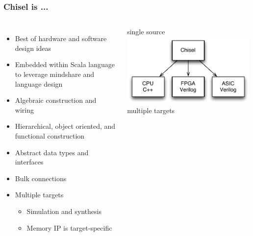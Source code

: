 \documentclass[xcolor=pdflatex,dvipsnames,table]{beamer}
\begin{document}
\begin{frame}[fragile]
\frametitle{Chisel is ...}

\begin{columns}[c]


\begin{itemize}
\item Best of hardware and software design ideas
\item Embedded within Scala language to leverage mindshare and language design
\item Algebraic construction and wiring
\item Hierarchical, object oriented, and functional construction
\item Abstract data types and interfaces
\item Bulk connections
\item Multiple targets
\begin{itemize}
\item Simulation and synthesis
\item Memory IP is target-specific
\end{itemize}
\end{itemize}


\begin{center}
single source \\
\includegraphics[width=0.99\textwidth]{./figs/targets.pdf} \\
multiple targets \\
\end{center}

\end{columns}

\end{frame}
\end{document}
